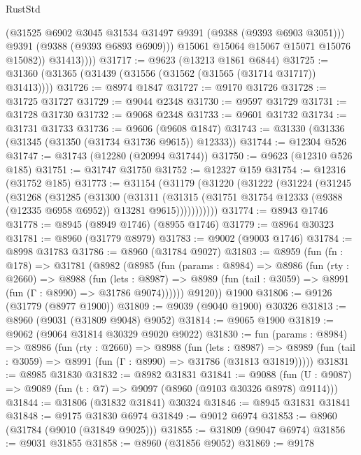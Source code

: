\begin{lexlean}{RustStd}
\begin{coremodule}
                  (@31525 @6902 @3045 @31534 @31497 @9391 (@9388 (@9393 @6903 @3051)))
                  @9391
                  (@9388 (@9393 @6893 @6909)))
                @15061
                @15064
                @15067
                @15071
                @15076
                @15082))
            @31413))))
@31717 := @9623 (@13213 @1861 @6844)
@31725 := @31360 (@31365 (@31439 (@31556 (@31562 (@31565 (@31714 @31717)) @31413))))
@31726 := @8974 @1847
@31727 := @9170 @31726
@31728 := @31725 @31727
@31729 := @9044 @2348
@31730 := @9597 @31729
@31731 := @31728 @31730
@31732 := @9068 @2348
@31733 := @9601 @31732
@31734 := @31731 @31733
@31736 := @9606 (@9608 @1847)
@31743 := @31330 (@31336 (@31345 (@31350 (@31734 @31736 @9615)) @12333))
@31744 := @12304 @526
@31747 := @31743 (@12280 (@20994 @31744))
@31750 := @9623 (@12310 @526 @185)
@31751 := @31747 @31750
@31752 := @12327 @159
@31754 := @12316 (@31752 @185)
@31773 := @31154
    (@31179
      (@31220
        (@31222
          (@31224
            (@31245
              (@31268
                (@31285
                  (@31300
                    (@31311
                      (@31315
                        (@31751 @31754 @12333 (@9388 (@12335 @6958 @6952)) @13281 @9615)))))))))))
@31774 := @8943 @1746
@31778 := @8945 (@8949 @1746) (@8955 @1746)
@31779 := @8964 @30323
@31781 := @8960 (@31779 @8979)
@31783 := @9002 (@9003 @1746)
@31784 := @8998 @31783
@31786 := @8960 (@31784 @9027)
@31803 := @8959
    (fun (fn : @178) =>
    @31781
      (@8982
        (@8985
          (fun (params : @8984) =>
          @8986
            (fun (rty : @2660) =>
            @8988
              (fun (lets : @8987) =>
              @8989 (fun (tail : @3059) => @8991 (fun (Γ : @8990) => @31786 @9074))))))
        @9120))
    @1900
@31806 := @9126 (@31779 (@8977 @1900))
@31809 := @9039 (@9040 @1900) @30326
@31813 := @8960 (@9031 (@31809 @9048) @9052)
@31814 := @9065 @1900
@31819 := @9062 (@9064 @31814 @30329 @9020 @9022)
@31830 := fun (params : @8984) =>
  @8986
    (fun (rty : @2660) =>
    @8988
      (fun (lets : @8987) =>
      @8989 (fun (tail : @3059) => @8991 (fun (Γ : @8990) => @31786 (@31813 @31819)))))
@31831 := @8985 @31830
@31832 := @8982 @31831
@31841 := @9088
    (fun (U : @9087) => @9089 (fun (t : @7) => @9097 (@8960 (@9103 @30326 @8978) @9114)))
@31844 := @31806 (@31832 @31841) @30324
@31846 := @8945 @31831 @31841
@31848 := @9175 @31830 @6974
@31849 := @9012 @6974
@31853 := @8960 (@31784 (@9010 (@31849 @9025)))
@31855 := @31809 (@9047 @6974)
@31856 := @9031 @31855
@31858 := @8960 (@31856 @9052)
@31869 := @9178

\end{coremodule}
\end{lexlean}
